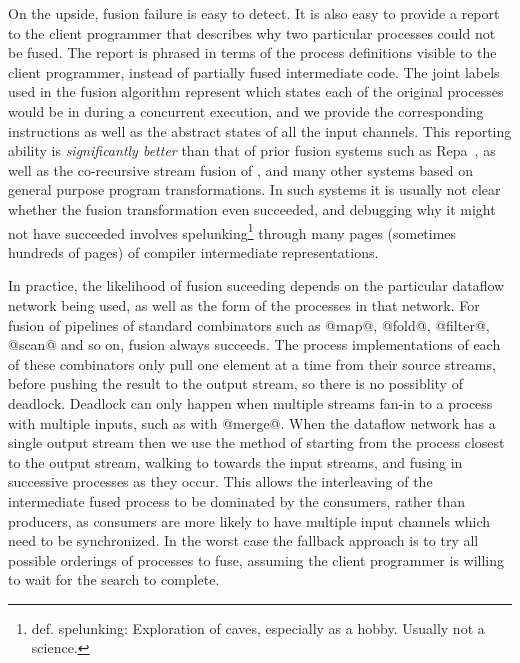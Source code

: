 On the upside, fusion failure is easy to detect. It is also easy to provide a report to the client programmer that describes why two particular processes could not be fused. The report is phrased in terms of the process definitions visible to the client programmer, instead of partially fused intermediate code. The joint labels used in the fusion algorithm represent which states each of the original processes would be in during a concurrent execution, and we provide the corresponding instructions as well as the abstract states of all the input channels. This reporting ability is \emph{significantly better} than that of prior fusion systems such as Repa~\cite{lippmeier2012:guiding}, as well as the co-recursive stream fusion of \cite{coutts2007stream}, and many other systems based on general purpose program transformations. In such systems it is usually not clear whether the fusion transformation even succeeded, and debugging why it might not have succeeded involves spelunking\footnote{def. spelunking: Exploration of caves, especially as a hobby. Usually not a science.} through many pages (sometimes hundreds of pages) of compiler intermediate representations.

In practice, the likelihood of fusion suceeding depends on the particular dataflow network being used, as well as the form of the processes in that network. For fusion of pipelines of standard combinators such as @map@, @fold@, @filter@, @scan@ and so on, fusion always succeeds. The process implementations of each of these combinators only pull one element at a time from their source streams, before pushing the result to the output stream, so there is no possiblity of deadlock. Deadlock can only happen when multiple streams fan-in to a process with multiple inputs, such as with @merge@. When the dataflow network has a single output stream then we use the method of starting from the process closest to the output stream, walking to towards the input streams, and fusing in successive processes as they occur. This allows the interleaving of the intermediate fused process to be dominated by the consumers, rather than producers, as consumers are more likely to have multiple input channels which need to be synchronized. In the worst case the fallback approach is to try all possible orderings of processes to fuse, assuming the client programmer is willing to wait for the search to complete. 




